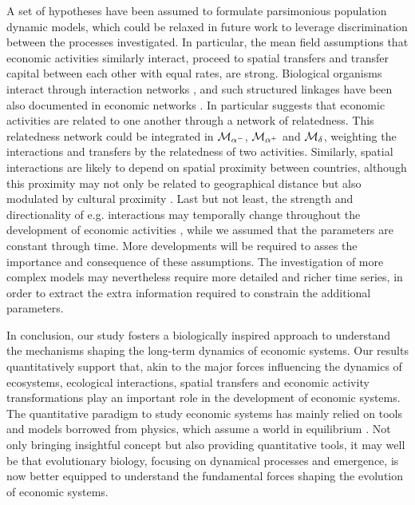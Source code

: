 A set of hypotheses have been assumed to formulate parsimonious population dynamic models, which could be relaxed in future work to leverage discrimination between the processes investigated. 
% 
In particular, the mean field assumptions that economic activities similarly interact, proceed to spatial transfers and transfer capital between each other with equal rates, are strong.
% 
Biological organisms interact through interaction networks \citep{Bascompte2003}, and  such structured linkages have been also documented in economic networks  \citep{C.A.HidalgoB.Klinger,Bustos2012,Saavedra2009a}. In particular \citep{C.A.HidalgoB.Klinger} suggests that economic activities are related to one another through a network of relatedness. This relatedness network could be integrated in $\mathcal{M}_{\alpha^-}$, $\mathcal{M}_{\alpha^+}$ and $\mathcal{M}_\delta$, weighting the interactions and transfers by the relatedness of two activities.
% 
Similarly, spatial interactions are likely to depend on spatial proximity between countries, although this proximity may not only be related to geographical distance but also modulated by cultural proximity \citep{Bahar2013}.
% 
Last but not least, the strength and directionality of e.g. interactions may temporally change throughout the development of economic activities \citep{Pistorius1997}, while we assumed that the parameters are constant through time.
% 
More developments will be required to asses the importance and consequence of these assumptions. The investigation of more complex models may nevertheless require more detailed and richer time series, in order to extract the extra information required to constrain the additional parameters.

In conclusion, our study fosters a biologically inspired approach to understand the mechanisms shaping the long-term dynamics of economic systems.
% 
Our results quantitatively support that, akin to the major forces influencing the dynamics of ecosystems, ecological interactions, spatial transfers and economic activity transformations play an important role in the development of economic systems. 
% 
The quantitative paradigm to study economic systems has mainly relied on tools and models borrowed from physics, which assume a world in equilibrium \citep{sornette2014physics}.
% 
Not only bringing insightful concept but also providing quantitative tools, it may well be that evolutionary biology, focusing on dynamical processes and emergence, is now better equipped to understand the fundamental forces shaping the evolution of economic systems.
% 
%
% 



